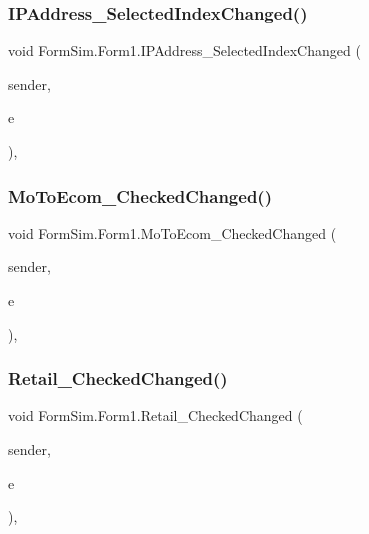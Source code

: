 \subsubsection{\texorpdfstring{I\+P\+Address\+\_\+\+Selected\+Index\+Changed()}{IPAddress\_SelectedIndexChanged()}}
{\footnotesize\ttfamily void Form\+Sim.\+Form1.\+I\+P\+Address\+\_\+\+Selected\+Index\+Changed (\begin{DoxyParamCaption}\item[{object}]{sender,  }\item[{Event\+Args}]{e }\end{DoxyParamCaption})\hspace{0.3cm}{\ttfamily [inline]}, {\ttfamily [private]}}

\mbox{\label{class_form_sim_1_1_form1_acace7bb65973370b2802f93a43495e1b}} 
\subsubsection{\texorpdfstring{Mo\+To\+Ecom\+\_\+\+Checked\+Changed()}{MoToEcom\_CheckedChanged()}}
{\footnotesize\ttfamily void Form\+Sim.\+Form1.\+Mo\+To\+Ecom\+\_\+\+Checked\+Changed (\begin{DoxyParamCaption}\item[{object}]{sender,  }\item[{Event\+Args}]{e }\end{DoxyParamCaption})\hspace{0.3cm}{\ttfamily [inline]}, {\ttfamily [private]}}

\mbox{\label{class_form_sim_1_1_form1_aa0ac63096f64895de6d57971386f8ee5}} 
\subsubsection{\texorpdfstring{Retail\+\_\+\+Checked\+Changed()}{Retail\_CheckedChanged()}}
{\footnotesize\ttfamily void Form\+Sim.\+Form1.\+Retail\+\_\+\+Checked\+Changed (\begin{DoxyParamCaption}\item[{object}]{sender,  }\item[{Event\+Args}]{e }\end{DoxyParamCaption})\hspace{0.3cm}{\ttfamily [inline]}, {\ttfamily [private]}}

